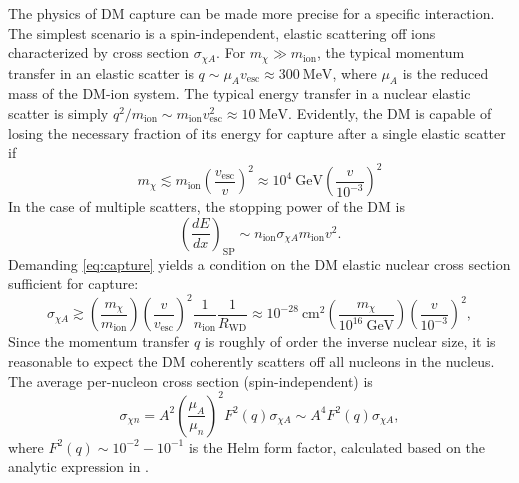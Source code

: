 \documentclass[preprintnumbers,amsmath,amssymb,prd,superscriptaddress]{revtex4}
\newcommand{\Eboom}{\mathcal{E}_\text{boom}}
\newcommand{\GeV}{\text{GeV}}
\newcommand{\MeV}{\text{MeV}}
\newcommand{\cm}{\text{cm}}
\def\r{\right)}
\def\l{\left(}
\begin{document}
The physics of DM capture can be made more precise for a specific interaction.
The simplest scenario is a spin-independent, elastic scattering off ions characterized by cross section $\sigma_{\chi A}$. 
For $m_\chi \gg m_\text{ion}$, the typical momentum transfer in an elastic scatter is $q \sim \mu_{A} v_\text{esc} \approx 300 ~\MeV$, where $\mu_{A}$ is the reduced mass of the DM-ion system. 
The typical energy transfer in a nuclear elastic scatter is simply $q^2/m_\text{ion} \sim m_\text{ion} v_\text{esc}^2 \approx 10 ~\MeV$. 
Evidently, the DM is capable of losing the necessary fraction of its energy for capture after a single elastic scatter if
\begin{equation}
m_\chi \lesssim m_\text{ion} \l \frac{v_\text{esc}}{v} \r^2 \approx 10^4 ~\GeV \l \frac{v}{10^{-3}} \r^2
\end{equation}
In the case of multiple scatters, the stopping power of the DM is
\begin{equation}
\left( \frac{d E}{d x} \right)_\text{SP} \sim n_\text{ion} \sigma_{\chi A} m_\text{ion} v^2.
\end{equation}
Demanding \eqref{eq:capture} yields a condition on the DM elastic nuclear cross section sufficient for capture:
\begin{equation}
\label{eq:capturecross}
\sigma_{\chi A} \gtrsim  \l \frac{m_\chi}{m_\text{ion}} \r \l \frac{v}{v_\text{esc}} \r^2 \frac{1}{n_\text{ion}} \frac{1}{R_\text{WD}} \approx 10^{-28} ~\cm^2 \l \frac{m_\chi}{10^{16} ~\GeV} \r \l \frac{v}{10^{-3}} \r^2,
\end{equation}
Since the momentum transfer $q$ is roughly of order the inverse nuclear size, it is reasonable to expect the DM coherently scatters off all nucleons in the nucleus. 
The average per-nucleon cross section (spin-independent) is
\begin{equation}
\sigma_{\chi n} = A^2 \l \frac{\mu_{A}}{\mu_{n}}\r^2 F^2(q) \sigma_{\chi A} \sim A^4 F^2(q) \sigma_{\chi A},
\end{equation}
where $F^2(q) \sim 10^{-2}-10^{-1}$ is the Helm form factor, calculated based on the analytic expression in \cite{LUX thesis}. 
\end{document}
